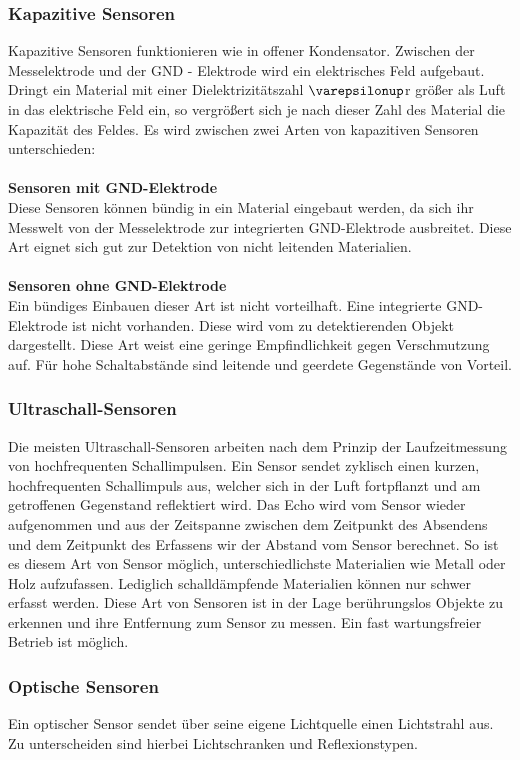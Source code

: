 \subsubsection{Kapazitive Sensoren}
Kapazitive Sensoren funktionieren wie in offener Kondensator.
Zwischen der Messelektrode und der GND - Elektrode wird ein elektrisches Feld aufgebaut.
Dringt ein Material mit einer Dielektrizitätszahl $\varepsilonup$r größer als Luft in das elektrische Feld ein, so vergrößert sich je nach dieser Zahl des Material die Kapazität des Feldes.
Es wird zwischen zwei Arten von kapazitiven Sensoren unterschieden: \\\\
\textbf{Sensoren mit GND-Elektrode} \\
Diese Sensoren können bündig in ein Material eingebaut werden, da sich ihr Messwelt von der Messelektrode zur integrierten GND-Elektrode ausbreitet.
Diese Art eignet sich gut zur Detektion von nicht leitenden Materialien. \\\\
\textbf{Sensoren ohne GND-Elektrode} \\
Ein bündiges Einbauen dieser Art ist nicht vorteilhaft. Eine integrierte GND-Elektrode ist nicht vorhanden. Diese wird vom zu detektierenden Objekt dargestellt.
Diese Art weist eine geringe Empfindlichkeit gegen Verschmutzung auf.
Für hohe Schaltabstände sind leitende und geerdete Gegenstände von Vorteil.

\subsubsection{Ultraschall-Sensoren}
Die meisten Ultraschall-Sensoren arbeiten nach dem Prinzip der Laufzeitmessung von hochfrequenten Schallimpulsen.
Ein Sensor sendet zyklisch einen kurzen, hochfrequenten Schallimpuls aus, welcher sich in der Luft fortpflanzt und am getroffenen Gegenstand reflektiert wird.
Das Echo wird vom Sensor wieder aufgenommen und aus der Zeitspanne zwischen dem Zeitpunkt des Absendens und dem Zeitpunkt des Erfassens wir der Abstand vom Sensor berechnet.
So ist es diesem Art von Sensor möglich, unterschiedlichste Materialien wie Metall oder Holz aufzufassen. Lediglich schalldämpfende Materialien können nur schwer erfasst werden.
Diese Art von Sensoren ist in der Lage berührungslos Objekte zu erkennen und ihre Entfernung zum Sensor zu messen. Ein fast wartungsfreier Betrieb ist möglich.

\subsubsection{Optische Sensoren}
Ein optischer Sensor sendet über seine eigene Lichtquelle einen Lichtstrahl aus.
Zu unterscheiden sind hierbei Lichtschranken und Reflexionstypen.


